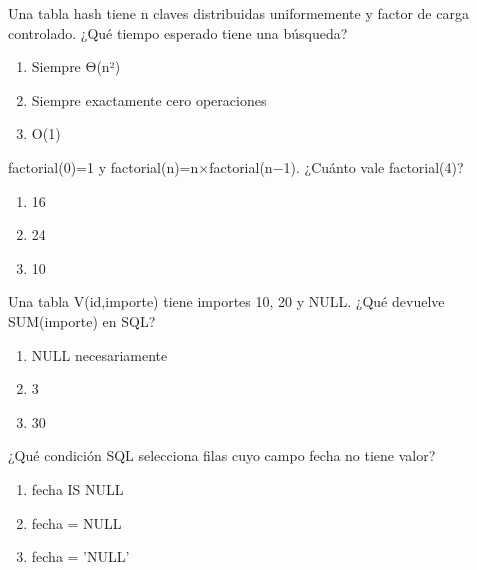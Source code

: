 \noindent\begin{minipage}{\linewidth}\setlength{\parskip}{4pt}\label{q:S-078}
Una tabla hash tiene n claves distribuidas uniformemente y factor de carga controlado. ¿Qué tiempo esperado tiene una búsqueda?
\begin{enumerate}[label=\Alph*),nosep]
\item Siempre Θ(n²)
\item Siempre exactamente cero operaciones
\item O(1)
\end{enumerate}\end{minipage}\par\medskip

\noindent\begin{minipage}{\linewidth}\setlength{\parskip}{4pt}\label{q:S-079}
factorial(0)=1 y factorial(n)=n×factorial(n−1). ¿Cuánto vale factorial(4)?
\begin{enumerate}[label=\Alph*),nosep]
\item 16
\item 24
\item 10
\end{enumerate}\end{minipage}\par\medskip

\noindent\begin{minipage}{\linewidth}\setlength{\parskip}{4pt}\label{q:S-080}
Una tabla V(id,importe) tiene importes 10, 20 y NULL. ¿Qué devuelve SUM(importe) en SQL?
\begin{enumerate}[label=\Alph*),nosep]
\item NULL necesariamente
\item 3
\item 30
\end{enumerate}\end{minipage}\par\medskip

\noindent\begin{minipage}{\linewidth}\setlength{\parskip}{4pt}\label{q:S-081}
¿Qué condición SQL selecciona filas cuyo campo fecha no tiene valor?
\begin{enumerate}[label=\Alph*),nosep]
\item fecha IS NULL
\item fecha = NULL
\item fecha = 'NULL'
\end{enumerate}\end{minipage}\par\medskip

